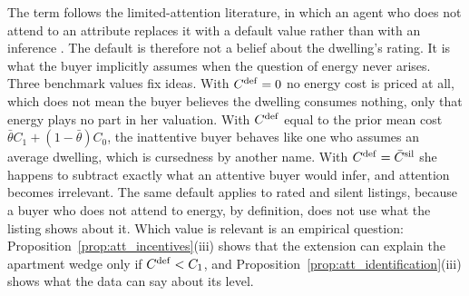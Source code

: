 The term follows the limited-attention literature, in which an agent who does not attend to an attribute replaces it with a default value rather than with an inference \citep{gabaix_sparsity_2014, gabaix_behavioral_2019}. The default is therefore not a belief about the dwelling's rating. It is what the buyer implicitly assumes when the question of energy never arises. Three benchmark values fix ideas. With $C^{\rm def}=0$ no energy cost is priced at all, which does not mean the buyer believes the dwelling consumes nothing, only that energy plays no part in her valuation. With $C^{\rm def}$ equal to the prior mean cost $\bar\theta C_1+(1-\bar\theta)C_0$, the inattentive buyer behaves like one who assumes an average dwelling, which is cursedness by another name. With $C^{\rm def}=\bar C^{\rm sil}$ she happens to subtract exactly what an attentive buyer would infer, and attention becomes irrelevant. The same default applies to rated and silent listings, because a buyer who does not attend to energy, by definition, does not use what the listing shows about it. Which value is relevant is an empirical question: Proposition~\ref{prop:att_incentives}(iii) shows that the extension can explain the apartment wedge only if $C^{\rm def}<C_1$, and Proposition~\ref{prop:att_identification}(iii) shows what the data can say about its level.
